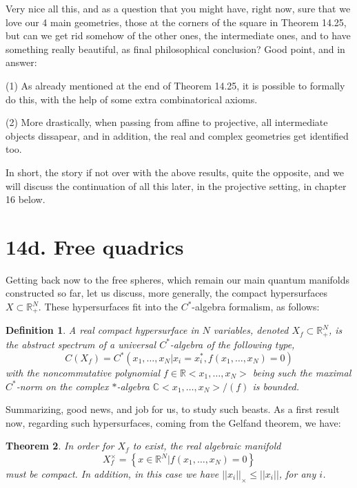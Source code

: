 \documentclass[12pt]{amsbook}
\newtheorem{theorem}{Theorem}[chapter]
\newtheorem{definition}[theorem]{Definition}
\begin{document}
Very nice all this, and as a question that you might have, right now, sure that we love our 4 main geometries, those at the corners of the square in Theorem 14.25, but can we get rid somehow of the other ones, the intermediate ones, and to have something really beautiful, as final philosophical conclusion? Good point, and in answer:

\bigskip

(1) As already mentioned at the end of Theorem 14.25, it is possible to formally do this, with the help of some extra combinatorical axioms.

\bigskip

(2) More drastically, when passing from affine to projective, all intermediate objects dissapear, and in addition, the real and complex geometries get identified too.

\bigskip

In short, the story if not over with the above results, quite the opposite, and we will discuss the continuation of all this later, in the projective setting, in chapter 16 below.

\section*{14d. Free quadrics}

Getting back now to the free spheres, which remain our main quantum manifolds constructed so far, let us discuss, more generally, the compact hypersurfaces $X\subset\mathbb R^N_+$. These hypersurfaces fit into the $C^*$-algebra formalism, as follows:


\begin{definition}
A real compact hypersurface in $N$ variables, denoted $X_f\subset\mathbb R^N_+$, is the abstract spectrum of a universal $C^*$-algebra of the following type,
$$C(X_f)=C^*\left(x_1,\ldots,x_N\Big|x_i=x_i^*,f(x_1,\ldots,x_N)=0\right)$$
with the noncommutative polynomial $f\in\mathbb R<x_1,\ldots,x_N>$ being such the maximal $C^*$-norm on the complex $*$-algebra $\mathbb C<x_1,\ldots,x_N>/(f)$ is bounded.
\end{definition}

Summarizing, good news, and job for us, to study such beasts. As a first result now, regarding such hypersurfaces, coming from the Gelfand theorem, we have:

\begin{theorem}
In order for $X_f$ to exist, the real algebraic manifold
$$X_f^\times=\left\{x\in\mathbb R^N\Big|f(x_1,\ldots,x_N)=0\right\}$$
must be compact. In addition, in this case we have $||x_i||_\times\leq||x_i||$, for any $i$.
\end{theorem}
\end{document}
